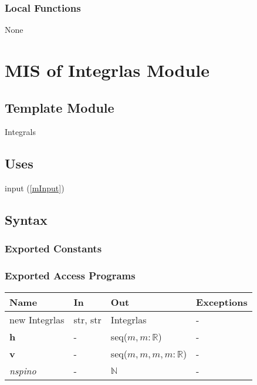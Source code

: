 \documentclass[12pt, titlepage]{article}
\begin{document}
\subsubsection{Local Functions}

None

\newpage

\section{MIS of Integrlas Module} \label{mIntegrals}

\subsection{Template Module}

Integrals

\subsection{Uses}
input (\ref{mInput})

\subsection{Syntax}

\subsubsection{Exported Constants}

\subsubsection{Exported Access Programs}

\begin{center}
	\begin{tabular}{p{2.7cm} p{4cm} p{4cm} p{2cm}}
		\hline
		\textbf{Name} & \textbf{In} & \textbf{Out} & \textbf{Exceptions} \\
		\hline
		new Integrlas& str, str& Integrlas& -\\
 		\textbf{h}& -& seq($m,m:\mathbb{R}$)& -\\
 		\textbf{v}& -& seq($m,m,m,m:\mathbb{R}$)& -\\
		\textit{nspino} & -& $\mathbb{N}$& -\\
		\hline
	\end{tabular}
\end{center}
\end{document}
